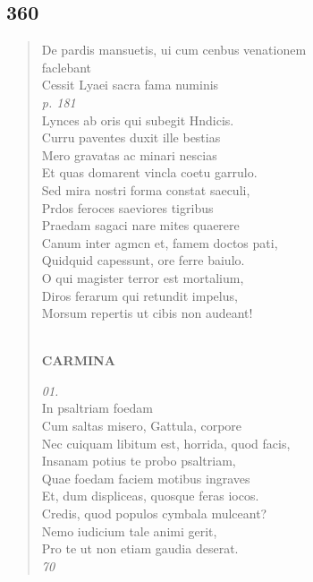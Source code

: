 \documentclass[11pt, a4paper]{report}
\begin{document}
            \subsection*{360}
      \begin{verse}
      De pardis mansuetis, ui cum cenbus venationem \\ faclebant \\ Cessit Lyaei sacra fama numinis \\ \textit{p. 181} \\ Lynces ab oris qui subegit Hndicis. \\ Curru paventes duxit ille bestias \\ Mero gravatas ac minari nescias \\ Et quas domarent vincla coetu garrulo. \\ Sed mira nostri forma constat saeculi, \\ Prdos feroces saeviores tigribus \\ Praedam sagaci nare mites quaerere \\ Canum inter agmcn et, famem doctos pati, \\ Quidquid capessunt, ore ferre baiulo. \\ O qui magister terror est mortalium, \\ Diros ferarum qui retundit impelus, \\ Morsum repertis ut cibis non audeant! \\ 
        ﻿\pagebreak 
     \marginpar{[020]} \begin{center} \textbf{CARMINA} \end{center}\textit{01.} \\ In psaltriam foedam \\ Cum saltas misero, Gattula, corpore \\ Nec cuiquam libitum est, horrida, quod facis, \\ Insanam potius te probo psaltriam, \\ Quae foedam faciem motibus ingraves \\ Et, dum displiceas, quosque feras iocos. \\ Credis, quod populos cymbala mulceant? \\ Nemo iudicium tale animi gerit, \\ Pro te ut non etiam gaudia deserat. \\ \textit{70} \\ 
      \end{verse}
  
\end{document}
